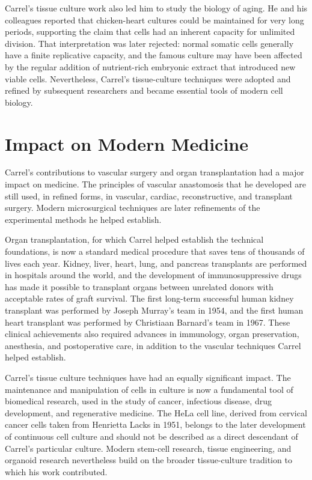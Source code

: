 Carrel's tissue culture work also led him to study the biology of aging. He and his colleagues reported that chicken-heart cultures could be maintained for very long periods, supporting the claim that cells had an inherent capacity for unlimited division. That interpretation was later rejected: normal somatic cells generally have a finite replicative capacity, and the famous culture may have been affected by the regular addition of nutrient-rich embryonic extract that introduced new viable cells. Nevertheless, Carrel's tissue-culture techniques were adopted and refined by subsequent researchers and became essential tools of modern cell biology.\cite{carrel-tissue}

\section{Impact on Modern Medicine}

Carrel's contributions to vascular surgery and organ transplantation had a major impact on medicine. The principles of vascular anastomosis that he developed are still used, in refined forms, in vascular, cardiac, reconstructive, and transplant surgery. Modern microsurgical techniques are later refinements of the experimental methods he helped establish.

Organ transplantation, for which Carrel helped establish the technical foundations, is now a standard medical procedure that saves tens of thousands of lives each year. Kidney, liver, heart, lung, and pancreas transplants are performed in hospitals around the world, and the development of immunosuppressive drugs has made it possible to transplant organs between unrelated donors with acceptable rates of graft survival. The first long-term successful human kidney transplant was performed by Joseph Murray's team in 1954, and the first human heart transplant was performed by Christiaan Barnard's team in 1967. These clinical achievements also required advances in immunology, organ preservation, anesthesia, and postoperative care, in addition to the vascular techniques Carrel helped establish.

Carrel's tissue culture techniques have had an equally significant impact. The maintenance and manipulation of cells in culture is now a fundamental tool of biomedical research, used in the study of cancer, infectious disease, drug development, and regenerative medicine. The HeLa cell line, derived from cervical cancer cells taken from Henrietta Lacks in 1951, belongs to the later development of continuous cell culture and should not be described as a direct descendant of Carrel's particular culture. Modern stem-cell research, tissue engineering, and organoid research nevertheless build on the broader tissue-culture tradition to which his work contributed.

